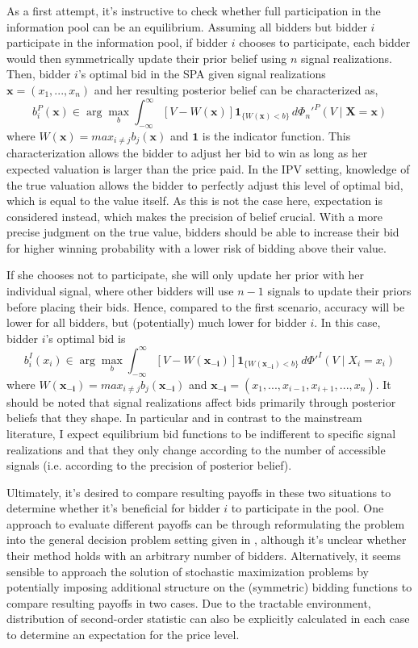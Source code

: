 As a first attempt, it's instructive to check whether full participation in the information pool can be an equilibrium. Assuming all bidders but bidder $i$ participate in the information pool, if bidder $i$ chooses to participate, each bidder would then symmetrically update their prior belief using $n$ signal realizations. Then, bidder $i$'s optimal bid in the SPA given signal realizations $\boldsymbol{x}=(x_1,...,x_n)$ and her resulting posterior belief can be characterized as,
\[b_i^P(\boldsymbol{x}) \in \arg\max_{b} \int_{-\infty}^{\infty} [V - W(\boldsymbol{x})]\mathbf{1}_{\{W(\boldsymbol{x})<b\}} \,d\Phi_n'^P(V\mid \boldsymbol{X}=\boldsymbol{x})\]
where $W(\boldsymbol{x})=max_{i \neq j}b_j(\boldsymbol{x})$ and $\mathbf{1}$ is the indicator function. This characterization allows the bidder to adjust her bid to win as long as her expected valuation is larger than the price paid. In the IPV setting, knowledge of the true valuation allows the bidder to perfectly adjust this level of optimal bid, which is equal to the value itself. As this is not the case here, expectation is considered instead, which makes the precision of belief crucial. With a more precise judgment on the true value, bidders should be able to increase their bid for higher winning probability with a lower risk of bidding above their value.

If she chooses not to participate, she will only update her prior with her individual signal, where other bidders will use $n-1$ signals to update their priors before placing their bids. Hence, compared to the first scenario, accuracy will be lower for all bidders, but (potentially) much lower for bidder $i$. In this case, bidder $i$'s optimal bid is
\[b_i^I(x_i) \in \arg\max_{b} \int_{-\infty}^{\infty} [V - W(\boldsymbol{x_{-i}})]\mathbf{1}_{\{W(\boldsymbol{x_{-i}})<b\}} \,d\Phi'^I(V\mid X_i=x_i)\]
where $W(\boldsymbol{x_{-i}})=max_{i \neq j}b_j(\boldsymbol{x_{-i}})$ and $\boldsymbol{x_{-i}}=(x_1,...,x_{i-1},x_{i+1},...,x_n)$. It should be noted that signal realizations affect bids primarily through posterior beliefs that they shape. In particular and in contrast to the mainstream literature, I expect equilibrium bid functions to be indifferent to specific signal realizations and that they only change according to the number of accessible signals (i.e. according to the precision of posterior belief). 

Ultimately, it's desired to compare resulting payoffs in these two situations to determine whether it's beneficial for bidder $i$ to participate in the pool. One approach to evaluate different payoffs can be through reformulating the problem into the general decision problem setting given in \cite{persico2000information}, although it's unclear whether their method holds with an arbitrary number of bidders. Alternatively, it seems sensible to approach the solution of stochastic maximization problems by potentially imposing additional structure on the (symmetric) bidding functions to compare resulting payoffs in two cases. Due to the tractable environment, distribution of second-order statistic can also be explicitly calculated in each case to determine an expectation for the price level.

